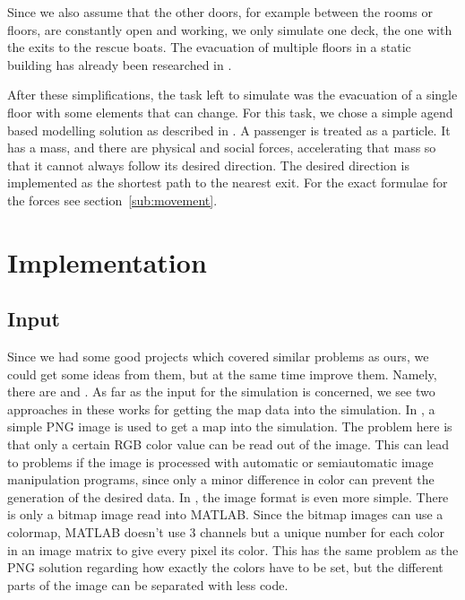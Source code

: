 \documentclass[11pt]{article}
\begin{document}
Since we also assume that the other doors, for example between the rooms or
floors, are constantly open and working, we only simulate one deck, the one
with the exits to the rescue boats.  The evacuation of multiple floors in a
static building has already been researched in \cite{multilevel}. 

After these simplifications, the task left to simulate was the evacuation of a
single floor with some elements that can change.  For this task, we chose a
simple agend based modelling solution as described in \cite{helbing}.  A
passenger is treated as a particle.  It has a mass, and there are physical and
social forces, accelerating that mass so that it cannot always follow its
desired direction.  The desired direction is implemented as the shortest path
to the nearest exit.  For the exact formulae for the forces see
section~\ref{sub:movement}.

\section{Implementation}

\subsection{Input}

\label{sub:input}

Since we had some good projects which covered similar
problems as ours, we could get some ideas from them, but at the same time
improve them.  Namely, there are \cite{multilevel} and \cite{airplane}.  As far
as the input for the simulation is concerned, we see two approaches in these
works for getting the map data into the simulation.  In \cite{multilevel}, a
simple PNG image is used to get a map into the simulation. The problem here is
that only a certain RGB color value can be read out of the image.  This can
lead to problems if the image is processed with automatic or semiautomatic
image manipulation programs, since only a minor difference in color can prevent
the generation of the desired data.  In \cite{airplane}, the image format is
even more simple.  There is only a bitmap image read into MATLAB.  Since the
bitmap images can use a colormap, MATLAB doesn't use 3 channels but a unique
number for each color in an image matrix to give every pixel its color.  This
has the same problem as the PNG solution regarding how exactly the colors have
to be set, but the different parts of the image can be separated with less
code.
\end{document}
